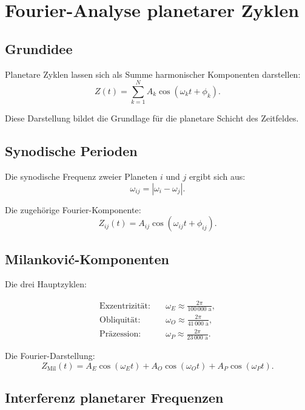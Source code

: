 
\section{Fourier-Analyse planetarer Zyklen}

\subsection{Grundidee}

Planetare Zyklen lassen sich als Summe harmonischer Komponenten darstellen:
\[
Z(t) = \sum_{k=1}^{N} A_k \cos(\omega_k t + \phi_k).
\]

Diese Darstellung bildet die Grundlage für die planetare Schicht des Zeitfeldes.

\subsection{Synodische Perioden}

Die synodische Frequenz zweier Planeten $i$ und $j$ ergibt sich aus:
\[
\omega_{ij} = |\omega_i - \omega_j|.
\]

Die zugehörige Fourier-Komponente:
\[
Z_{ij}(t) = A_{ij} \cos(\omega_{ij} t + \phi_{ij}).
\]

\subsection{Milanković-Komponenten}

Die drei Hauptzyklen:

\begin{align*}
\text{Exzentrizität:} &\quad \omega_E \approx \frac{2\pi}{100\,000 \text{ a}}, \\
\text{Obliquität:} &\quad \omega_O \approx \frac{2\pi}{41\,000 \text{ a}}, \\
\text{Präzession:} &\quad \omega_P \approx \frac{2\pi}{23\,000 \text{ a}}.
\end{align*}

Die Fourier-Darstellung:
\[
Z_{\text{Mil}}(t) = A_E \cos(\omega_E t) +
A_O \cos(\omega_O t) +
A_P \cos(\omega_P t).
\]

\subsection{Interferenz planetarer Frequenzen}

